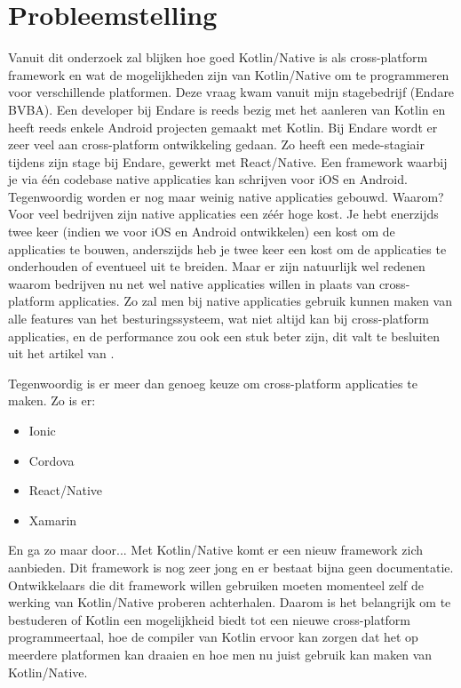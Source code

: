 \section{Probleemstelling}
\label{sec:probleemstelling}
Vanuit dit onderzoek zal blijken hoe goed Kotlin/Native is als cross-platform framework en wat de mogelijkheden zijn van Kotlin/Native om te programmeren voor verschillende platformen. Deze vraag kwam vanuit mijn stagebedrijf (Endare BVBA). Een developer bij Endare is reeds bezig met het aanleren van Kotlin en heeft reeds enkele Android projecten gemaakt met Kotlin. Bij Endare wordt er zeer veel aan cross-platform ontwikkeling gedaan. Zo heeft een mede-stagiair tijdens zijn stage bij Endare, gewerkt met React/Native. Een framework waarbij je via één codebase native applicaties kan schrijven voor iOS en Android. Tegenwoordig worden er nog maar weinig native applicaties gebouwd. Waarom? Voor veel bedrijven zijn native applicaties een zéér hoge kost. Je hebt enerzijds twee keer (indien we voor iOS en Android ontwikkelen) een kost om de applicaties te bouwen, anderszijds heb je twee keer een kost om de applicaties te onderhouden of eventueel uit te breiden. Maar er zijn natuurlijk wel redenen waarom bedrijven nu net wel native applicaties willen in plaats van cross-platform applicaties. Zo zal men bij native applicaties gebruik kunnen maken van alle features van het besturingssysteem, wat niet altijd kan bij cross-platform applicaties, en de performance zou ook een stuk beter zijn, dit valt te besluiten uit het artikel van \textcite{NativeVsCross}. 

Tegenwoordig is er meer dan genoeg keuze om cross-platform applicaties te maken. Zo is er:
\begin{itemize}
	\item Ionic
	\item Cordova
	\item React/Native
	\item Xamarin
\end{itemize}
En ga zo maar door... Met Kotlin/Native komt er een nieuw framework zich aanbieden. Dit framework is nog zeer jong en er bestaat bijna geen documentatie. Ontwikkelaars die dit framework willen gebruiken moeten momenteel zelf de werking van Kotlin/Native proberen achterhalen. Daarom is het belangrijk om te bestuderen of Kotlin een mogelijkheid biedt tot een nieuwe cross-platform programmeertaal, hoe de compiler van Kotlin ervoor kan zorgen dat het op meerdere platformen kan draaien en hoe men nu juist gebruik kan maken van Kotlin/Native. 

